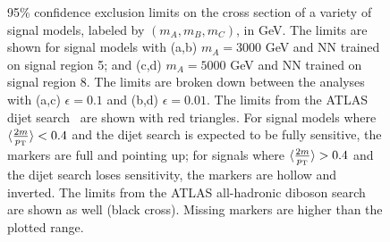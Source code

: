 \begin{figure}[h!]
    \caption{
	95\% confidence exclusion limits on the cross section of a variety of signal models, labeled by $(m_A,m_B,m_C)$, in GeV.
	The limits are shown for signal models with (a,b) $m_A=3000$ GeV and NN trained on signal region 5; and (c,d) $m_A=5000$ GeV and NN trained on signal region 8.
	The limits are broken down between the analyses with (a,c) $\epsilon=0.1$ and (b,d) $\epsilon=0.01$.
	The limits from the ATLAS dijet search~\cite{Aad:2019hjw} are shown with red triangles.
	For signal models where $\langle \frac{2m}{p_{\text{T}}}\rangle < 0.4$ and the dijet search is expected to be fully sensitive, the markers are full and pointing up; for signals where $\langle \frac{2m}{p_{\text{T}}}\rangle > 0.4$ and the dijet search loses sensitivity, the markers are hollow and inverted.
	The limits from the ATLAS all-hadronic diboson search~\cite{Aad:2019fbh} are shown as well (black cross).
	Missing markers are higher than the plotted range.
}
    \label{fig:CWoLa:sigma95}
\end{figure}

\FloatBarrier

